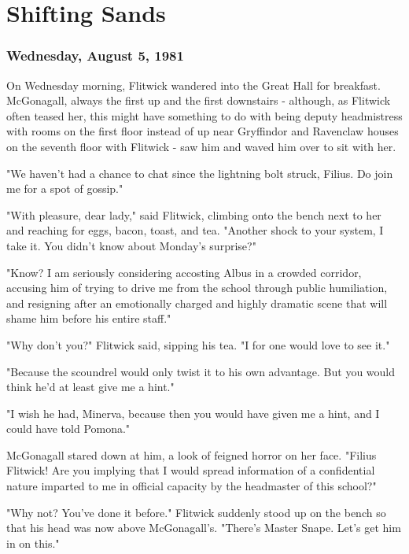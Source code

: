 
\chapter{Shifting Sands}

\subsection{Wednesday, August 5, 1981}

On Wednesday morning, Flitwick wandered into the Great Hall for breakfast. McGonagall, always the first up and the first downstairs - although, as Flitwick often teased her, this might have something to do with being deputy headmistress with rooms on the first floor instead of up near Gryffindor and Ravenclaw houses on the seventh floor with Flitwick - saw him and waved him over to sit with her.

"We haven't had a chance to chat since the lightning bolt struck, Filius. Do join me for a spot of gossip."

"With pleasure, dear lady," said Flitwick, climbing onto the bench next to her and reaching for eggs, bacon, toast, and tea. "Another shock to your system, I take it. You didn't know about Monday's surprise?"

"Know? I am seriously considering accosting Albus in a crowded corridor, accusing him of trying to drive me from the school through public humiliation, and resigning after an emotionally charged and highly dramatic scene that will shame him before his entire staff."

"Why don't you?" Flitwick said, sipping his tea. "I for one would love to see it."

"Because the scoundrel would only twist it to his own advantage. But you would think he'd at least give me a hint."

"I wish he had, Minerva, because then you would have given me a hint, and I could have told Pomona."

McGonagall stared down at him, a look of feigned horror on her face. "Filius Flitwick! Are you implying that I would spread information of a confidential nature imparted to me in official capacity by the headmaster of this school?"

"Why not? You've done it before." Flitwick suddenly stood up on the bench so that his head was now above McGonagall's. "There's Master Snape. Let's get him in on this."

